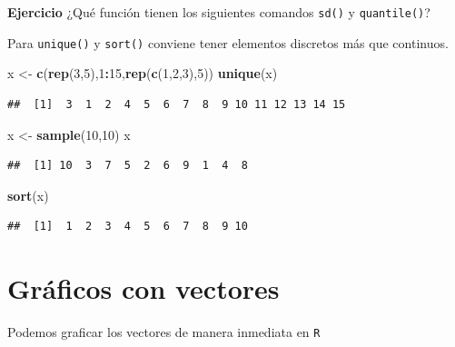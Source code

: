 \documentclass[
]{book}
\newenvironment{Shaded}{\begin{snugshade}}{\end{snugshade}}
\newcommand{\DecValTok}[1]{\textcolor[rgb]{0.00,0.00,0.81}{#1}}
\newcommand{\FunctionTok}[1]{\textcolor[rgb]{0.13,0.29,0.53}{\textbf{#1}}}
\newcommand{\NormalTok}[1]{#1}
\newcommand{\OtherTok}[1]{\textcolor[rgb]{0.56,0.35,0.01}{#1}}
\newcommand{\SpecialCharTok}[1]{\textcolor[rgb]{0.81,0.36,0.00}{\textbf{#1}}}
\begin{document}
\textbf{Ejercicio} ¿Qué función tienen los siguientes comandos \texttt{sd()} y \texttt{quantile()}?

Para \texttt{unique()} y \texttt{sort()} conviene tener elementos discretos más que continuos.

\begin{Shaded}
\begin{Highlighting}[]
\NormalTok{x }\OtherTok{\textless{}{-}} \FunctionTok{c}\NormalTok{(}\FunctionTok{rep}\NormalTok{(}\DecValTok{3}\NormalTok{,}\DecValTok{5}\NormalTok{),}\DecValTok{1}\SpecialCharTok{:}\DecValTok{15}\NormalTok{,}\FunctionTok{rep}\NormalTok{(}\FunctionTok{c}\NormalTok{(}\DecValTok{1}\NormalTok{,}\DecValTok{2}\NormalTok{,}\DecValTok{3}\NormalTok{),}\DecValTok{5}\NormalTok{))}
\FunctionTok{unique}\NormalTok{(x)}
\end{Highlighting}
\end{Shaded}

\begin{verbatim}
##  [1]  3  1  2  4  5  6  7  8  9 10 11 12 13 14 15
\end{verbatim}

\begin{Shaded}
\begin{Highlighting}[]
\NormalTok{x }\OtherTok{\textless{}{-}} \FunctionTok{sample}\NormalTok{(}\DecValTok{10}\NormalTok{,}\DecValTok{10}\NormalTok{)}
\NormalTok{x}
\end{Highlighting}
\end{Shaded}

\begin{verbatim}
##  [1] 10  3  7  5  2  6  9  1  4  8
\end{verbatim}

\begin{Shaded}
\begin{Highlighting}[]
\FunctionTok{sort}\NormalTok{(x)}
\end{Highlighting}
\end{Shaded}

\begin{verbatim}
##  [1]  1  2  3  4  5  6  7  8  9 10
\end{verbatim}

\section{Gráficos con vectores}\label{gruxe1ficos-con-vectores}

Podemos graficar los vectores de manera inmediata en \texttt{R}
\end{document}
